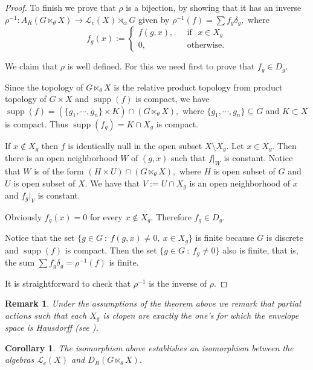 \documentclass[11pt, a4paper]{amsart}
\newcommand{\Gx}{\ensuremath {G \ltimes_\theta X}}
\newcommand{\Lc}{\ensuremath {\mathcal{L}_c(X)}}
\newcommand{\Lg}{\ensuremath {\mathcal{L}_c(X)\rtimes_{\alpha} G}}
\DeclareMathOperator{\supp}{supp}
\theoremstyle{plain}
\newtheorem{corollary}[theorem]{Corollary}
\newtheorem{remark}[theorem]{Remark}
\begin{document}
\begin{proof}
To finish we prove that $\rho$ is a bijection, by showing that it has an inverse $\rho^{-1}: A_R(\Gx) \rightarrow \Lg$ given by $\rho^{-1}(f)=\sum f_g\delta_g,$  where
 $$f_g(x):= \left\lbrace \begin{array}{lcl}
 f(g, x), & & \mbox{if} \,\,\,\, x \in X_{g} \\
 0, & & \mbox{otherwise.}
 \end{array} \right.$$

We claim that $\rho$ is well defined. For this we need first to prove that $f_g \in D_g.$

Since the topology of $\Gx$ is the relative product topology from  product topology of $G \times X$ and  $\supp(f)$ is compact, we have  $\supp(f)=(\{g_1, \cdots , g_n \} \times K) \cap (\Gx),$ where $\{g_1, \cdots , g_n\} \subseteq G$ and $K \subset X$ is compact. Thus $\supp(f_g)= K \cap X_g$ is compact.

If $x \notin X_g$ then $f$ is identically null in the open subset $X \setminus X_g.$ Let $x \in X_g.$ Then there is an open neighborhood $W$ of $(g,x)$ such that $f|_W$ is constant. Notice that $W$ is of the form  $(H \times U)\cap (\Gx), $ where $H$ is open subset of $G$ and $U$ is open subset of $X.$ We have that $V := U \cap X_g$ is an open neighborhood of $x$ and $f_g|_V$ is constant. 

Obviously $f_g(x)=0$ for every $x \notin X_g.$ Therefore $f_g \in D_g.$

Notice that the set $\{g \in G \ : \  f(g,x) \neq 0, \ x \in X_g \}$ is finite because $G$ is discrete and $\supp(f)$ is compact. Then the set $\{g \in G \ : \ f_g \neq 0\}$ also is finite, that is, the sum  $\sum f_g\delta_g = \rho^{-1}(f)$ is finite. 

It is straightforward to check that $\rho^{-1}$ is the inverse of $\rho.$
\end{proof}

\begin{remark} Under the assumptions of the theorem above we remark that partial actions such that each $X_g$ is clopen are exactly the one's for which the envelope space is Hausdorff (see \cite{EGG}).
\end{remark}

\begin{corollary}\label{coroldiagonal}
The isomorphism above establishes an isomorphism between the algebras $\Lc $ and $D_R(\Gx).$ 
\end{corollary}
\end{document}
